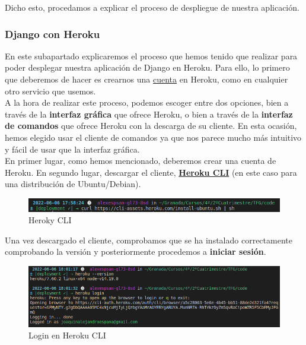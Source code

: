 Dicho esto, procedamos a explicar el proceso de despliegue de nuestra aplicación.

\subsubsection{Django con Heroku}
En este subapartado explicaremos el proceso \cite{heroku-with-django} que hemos tenido que
realizar para poder desplegar nuestra aplicación de Django en Heroku. Para ello, lo primero
que deberemos de hacer es crearnos una \href{https://id.heroku.com/login}{cuenta} en Heroku,
como en cualquier otro servicio que usemos.\\

A la hora de realizar este proceso, podemos escoger entre dos opciones, bien a través de la
\textbf{interfaz gráfica} que ofrece Heroku, o bien a través de la \textbf{interfaz de
comandos} que ofrece Heroku con la descarga de su cliente. En esta ocasión, hemos elegido usar
el cliente de comandos ya que nos parece mucho más intuitivo y fácil de usar que la interfaz
gráfica.\\

En primer lugar, como hemos mencionado, deberemos crear una cuenta de Heroku. En segundo
lugar, descargar el cliente, \href{https://shorturl.at/emHJY} {\textbf{Heroku CLI}}
(en este caso para una distribución de Ubuntu/Debian).
        
    \begin{figure}[H]
        \centering
        \includegraphics[scale=0.47]{imagenes/heroku-cli.png}
        \caption{Heroky CLI}
        \label{fig:heroku-cli}
    \end{figure}

Una vez descargado el cliente, comprobamos que se ha instalado correctamente comprobando
la versión y posteriormente procedemos a \textbf{iniciar sesión}.

    \begin{figure}[H]
        \centering
        \includegraphics[scale=0.42]{imagenes/heroku-version-login.png}
        \caption{Login en Heroku CLI}
        \label{fig:heroku-version-login}
    \end{figure}

